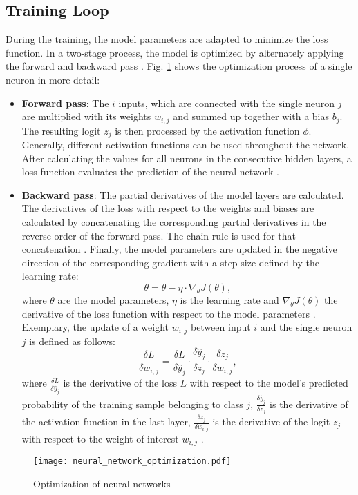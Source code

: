 \subsection{Training Loop}
During the training, the model parameters are adapted to minimize the loss function. In a two-stage process, the model is optimized by alternately applying the forward and backward pass \cite{ShilohPerl2020}. Fig.  \ref{fig:neural_network_optimization} shows the optimization process of a single neuron in more detail:
\begin{itemize}
    \item \textbf{Forward pass}: The $i$ inputs, which are connected with the single neuron $j$ are multiplied with its weights $w_{i,j}$ and summed up together with a bias $b_{j}$. The resulting logit $z_{j}$ is then processed by the activation function $\phi$. Generally, different activation functions can be used throughout the network. After calculating the values for all neurons in the consecutive hidden layers, a loss function evaluates the prediction of the neural network \cite{AN201942}.
    \item \textbf{Backward pass}: 
    The partial derivatives of the model layers are calculated. The derivatives of the loss with respect to the weights and biases are calculated by concatenating the corresponding partial derivatives in the reverse order of the forward pass. The chain rule is used for that concatenation \cite{ShilohPerl2020}. Finally, the model parameters are updated in the negative direction of the corresponding gradient with a step size defined by the learning rate:
    \begin{equation}
        \theta = \theta - \eta \cdot {\nabla}_{\theta}J(\theta),
    \end{equation}
    where $\theta$ are the model parameters, $\eta$ is the learning rate and ${\nabla}_{\theta}J(\theta)$ the derivative of the loss function with respect to the model parameters \cite{Lydia2019}. Exemplary, the update of a weight $w_{i,j}$ between input $i$ and the single neuron $j$ is defined as follows:
    \begin{equation}
     \frac{\delta L}{\delta w_{i,j}} = \frac{\delta L}{\delta \hat{y}_{j}} \cdot \frac{\delta \hat{y}_{j}}{\delta z_{j}} \cdot \frac{\delta z_{j}}{\delta w_{i,j}}, 
     \label{chain_rule}
    \end{equation}
where $\frac{\delta L}{\delta \hat{y}_{j}}$ is the derivative of the loss $L$ with respect to the model's predicted probability of the training sample belonging to class $j$, $\frac{\delta \hat{y}_{j}}{\delta z_{j}}$ is the derivative of the activation function in the last layer, $ \frac{\delta z_{j}}{\delta w_{i,j}}$ is the derivative of the logit $z_{j}$ with respect to the weight of interest $w_{i,j}$ \cite{ShilohPerl2020}. 
\end{itemize}
\begin{figure}[H]
  \centering
  \texttt{[image: neural\_network\_optimization.pdf]}
  \caption {Optimization of neural networks}
  \label{fig:neural_network_optimization}
\end{figure}

